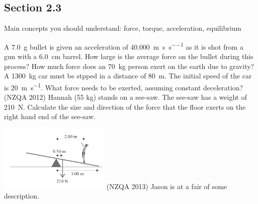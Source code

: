 \documentclass[a4paper]{exam}
\begin{document}
  \subsection*{Section 2.3}
  Main concepts you should understand: force, torque, acceleration, equilibrium
  \begin{questions}
    \question A \SI{7.0}{\gram} bullet is given an acceleration of \SI{40,000}{\metre\per\second\per\second} as it is shot from
              a gun with a \SI{6.0}{\centi\metre} barrel. How large is the average force on the bullet during this process?
    \question How much force does an \SI{70}{\kilo\gram} person exert on the earth due to gravity?
    \question A \SI{1300}{\kilo\gram} car must be stpped in a distance of \SI{80}{\metre}. The initial speed of the car
              is \SI{20}{\metre\per\second}. What force needs to be exerted, assuming constant deceleration?
    \question (NZQA 2012) Hannah (55 kg) stands on a see-saw. The see-saw has a weight of \SI{210}{\newton}. Calculate the
              size and direction of the force that the floor exerts on the right hand end of the see-saw.

              \includegraphics[width=0.4\textwidth]{nzqa20121}
    \question (NZQA 2013) Jason is at a fair of some description.
\end{questions}
\end{document}
